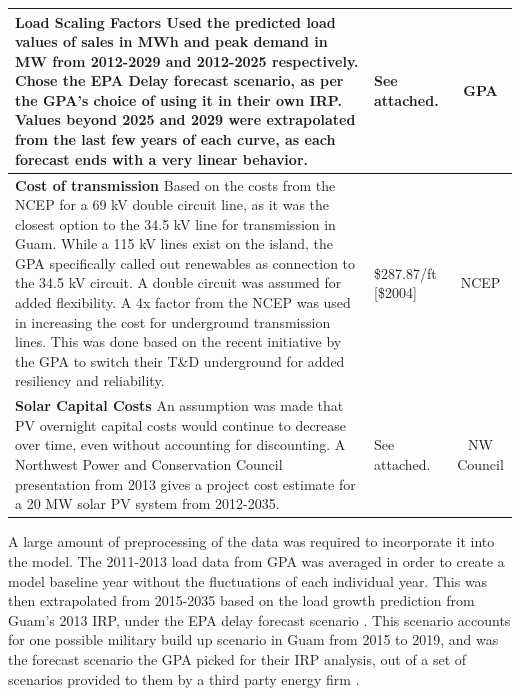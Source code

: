 \documentclass[12pt,letterpaper,fleqn]{article}
\begin{document}
\begin{center}
\begin{longtable}{| p{10cm} | p{4cm} | c | }
    \textbf{Load Scaling Factors} Used the predicted load values of
    sales in MWh and peak demand in MW from 2012-2029 and 2012-2025
    respectively. Chose the EPA Delay forecast scenario, as per the
    GPA's choice of using it in their own IRP. Values beyond 2025 and
    2029 were extrapolated from the last few years of each curve, as
    each forecast ends with a very linear behavior. & See attached. &
    GPA \cite{cruz13} \\\hline

    \textbf{Cost of transmission} Based on the costs from the NCEP for
    a 69 kV double circuit line, as it was the closest option to the
    34.5 kV line for transmission in Guam. While a 115 kV lines exist
    on the island, the GPA specifically called out renewables as
    connection to the 34.5 kV circuit. A double circuit was assumed
    for added flexibility. A 4x factor from the NCEP was used in
    increasing the cost for underground transmission lines. This was
    done based on the recent initiative by the GPA to switch their
    T\&D underground for added resiliency and reliability. &
    \$287.87/ft [\$2004] & NCEP \cite{brown04} \\\hline

    \textbf{Solar Capital Costs} An assumption was made that PV
    overnight capital costs would continue to decrease over time,
    even without accounting for discounting. A Northwest Power and
    Conservation Council presentation from 2013 gives a project cost
    estimate for a 20 MW solar PV system from 2012-2035.  & See
    attached. & NW Council \cite{simmons13} \\\hline
  \end{longtable}
\end{center}

A large amount of preprocessing of the data was required to
incorporate it into the model. The 2011-2013 load data from GPA was
averaged in order to create a model baseline year without the
fluctuations of each individual year. This was then extrapolated from
2015-2035 based on the load growth prediction from Guam's 2013 IRP, under
the EPA delay forecast scenario \cite{cruz13}. This scenario accounts for
one possible military build up scenario in Guam from 2015 to 2019, and
was the forecast scenario the GPA picked for their IRP analysis, out of a set
of scenarios provided to them by a third party energy firm \cite{cruz13}.
\end{document}
